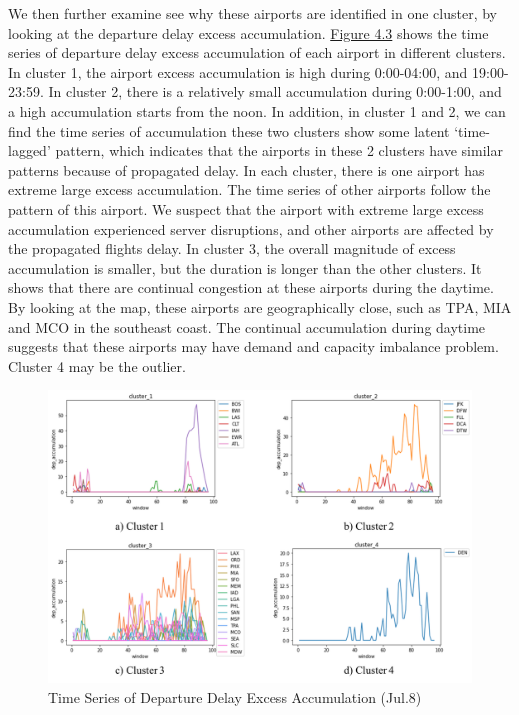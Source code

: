 We then further examine see why these airports are identified in one cluster, by looking at the departure delay excess accumulation.  \hyperref[fig:4-3]{Figure 4.3} shows the time series of departure delay excess accumulation of each airport in different clusters. In cluster 1, the airport excess accumulation is high during 0:00-04:00, and 19:00-23:59. In cluster 2, there is a relatively small accumulation during 0:00-1:00, and a high accumulation starts from the noon. In addition, in cluster 1 and 2, we can find the time series of accumulation these two clusters show some latent ‘time-lagged’ pattern, which indicates that the airports in these 2 clusters have similar patterns because of propagated delay. In each cluster, there is one airport has extreme large excess accumulation. The time series of other airports follow the pattern of this airport. We suspect that the airport with extreme large excess accumulation experienced server disruptions, and other airports are affected by the propagated flights delay. In cluster 3, the overall magnitude of excess accumulation is smaller, but the duration is longer than the other clusters. It shows that there are continual congestion at these airports during the daytime. By looking at the map, these airports are geographically close, such as TPA, MIA and MCO in the southeast coast. The continual accumulation during daytime suggests that these airports may have demand and capacity imbalance problem. Cluster 4 may be the outlier.

\begin{figure}[thbp]
    \label{fig:4-3}
    \centering
    \includegraphics[width=\textwidth]{img/4 clusters.png}
    \caption{Time Series of Departure Delay Excess Accumulation (Jul.8)}
\end{figure}

